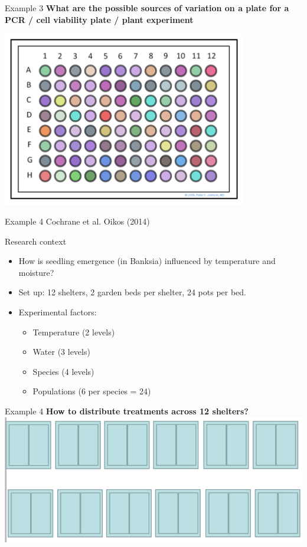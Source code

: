 \documentclass{beamer}
\begin{document}
\begin{frame}{Example 3}
 \textbf{What are the possible sources of variation on a plate for a PCR / cell viability plate / plant experiment}
 
 \centering
 \includegraphics[width=0.8\textwidth]{Figures/expdesc}
\end{frame}

\begin{frame}{Example 4}
Cochrane et al. Oikos (2014)
\begin{block}{Research context}
\begin{itemize}
  \item How is seedling emergence (in Banksia) influenced by temperature and moisture?
  \item Set up: 12 shelters, 2 garden beds per shelter, 24 pots per bed.
  \item Experimental factors: 
    \begin{itemize}
      \item Temperature (2 levels)
      \item Water (3 levels)
      \item Species (4 levels) 
      \item Populations (6 per species = 24)
     \end{itemize}
\end{itemize}
\end{block}

\end{frame}

\begin{frame}{Example 4}
\textbf{How to distribute treatments across 12 shelters?}
  \centering
  \includegraphics[width=\textwidth]{Figures/shelters}
\end{frame}
\end{document}
